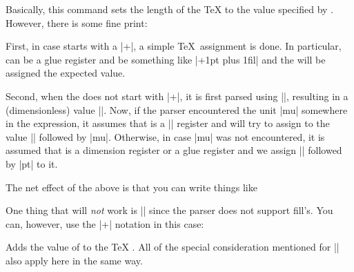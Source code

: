 \begin{command}{\pgfmathsetlength{}}
    Basically, this command sets the length of the \TeX{}  to
    the value specified by . However, there is some fine
    print:

    First, in case  starts with a |+|, a simple \TeX\
    assignment is done. In particular,  can be a glue register
    and \meta{expression} be something like |+1pt plus 1fil| and the
    \meta{register} will be assigned the expected value.

    Second, when the  does not start with |+|, it is first
    parsed using |\pgfmathparse|, resulting in a (dimensionless) value
    |\pgfmathresult|. Now, if the parser encountered the unit |mu| somewhere in
    the expression, it assumes that  is a |\muskip| register and
    will try to assign to  the value |\pgfmathresult| followed
    by |mu|. Otherwise, in case |mu| was not encountered, it is assumed that
    \meta{register} is a dimension register or a glue register and we assign
    |\pgfmathresult| followed by |pt| to it.

    The net effect of the above is that you can write things like
\begin{codeexample}[]
  \muskipdef{}
   \the\mymuskip
\end{codeexample}
\begin{codeexample}[]
  \dimendef{}
    \the\mydimen
\end{codeexample}
\begin{codeexample}[]
  \skipdef{}
    \the\myskip
\end{codeexample}

    One thing that will \emph{not} work is
    || since the parser does not
    support fill's. You can, however, use the |+| notation in this case:
\begin{codeexample}[]
  \skipdef{}
    \the\myskip
\end{codeexample}
\end{command}

\begin{command}{\pgfmathaddtolength{}}
    Adds the value of \meta{expression} to the \TeX{} \meta{register}. All of
    the special consideration mentioned for |\pgfmathsetlength| also apply here
    in the same way.
\end{command}


